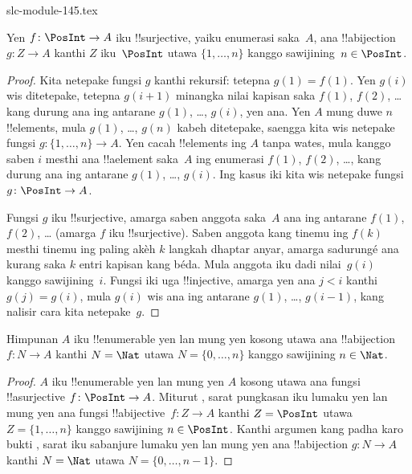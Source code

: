 \begin{filecontents*}[overwrite]{slc-module-145.tex}
\begin{prop}
Yen $f\colon \PosInt \to A$ iku !!{surjective}, yaiku enumerasi
saka~$A$, ana !!a{bijection} $g\colon Z \to A$ kanthi $Z$
iku~$\PosInt$ utawa $\{1, \dots, n\}$ kanggo sawijining~$n \in \PosInt$.
\end{prop}

\begin{proof}
  Kita netepake fungsi $g$ kanthi rekursif: tetepna $g(1) = f(1)$. Yen $g(i)$
  wis ditetepake, tetepna $g(i+1)$ minangka nilai kapisan saka $f(1)$,
  $f(2)$, \dots{} kang durung ana ing antarane $g(1)$, \dots, $g(i)$, yen ana.
  Yen $A$ mung duwe $n$ !!{element}s, mula $g(1)$, \dots, $g(n)$ kabeh
  ditetepake, saengga kita wis netepake fungsi $g\colon \{1, \dots, n\}
  \to A$. Yen cacah !!{element}s ing $A$ tanpa wates, mula kanggo saben $i$
  mesthi ana !!a{element} saka~$A$ ing enumerasi $f(1)$, $f(2)$,
  \dots, kang durung ana ing antarane $g(1)$, \dots, $g(i)$. Ing kasus
  iki kita wis netepake fungsi $g\colon \PosInt \to A$.

  Fungsi $g$ iku !!{surjective}, amarga saben anggota saka~$A$ ana
  ing antarane $f(1)$, $f(2)$, \dots{} (amarga $f$ iku !!{surjective}).
  Saben anggota kang tinemu ing $f(k)$ mesthi tinemu
ing paling akèh $k$ langkah dhaptar anyar, amarga sadurungé ana kurang saka
  $k$ entri kapisan kang béda. Mula anggota iku dadi nilai~$g(i)$
  kanggo sawijining~$i$. Fungsi iki uga
  !!{injective}, amarga yen ana $j < i$ kanthi $g(j) = g(i)$,
  mula $g(i)$ wis ana ing antarane $g(1)$, \dots, $g(i-1)$, kang
  nalisir cara kita netepake~$g$.
\end{proof}

\begin{cor}
Himpunan $A$ iku !!{enumerable} yen lan mung yen kosong utawa ana !!a{bijection}
$f\colon N \to A$ kanthi $N = \Nat$ utawa $N = \{0, \dots, n\}$ kanggo
sawijining $n \in \Nat$.
\end{cor}

\begin{proof}
$A$ iku !!{enumerable} yen lan mung yen $A$ kosong utawa ana fungsi !!a{surjective}
$f\colon \PosInt \to A$. Miturut , sarat pungkasan iku
lumaku yen lan mung yen ana fungsi !!a{bijective}~$f\colon Z \to A$ kanthi $Z =
\PosInt$ utawa $Z = \{1, \dots, n\}$ kanggo sawijining $n \in \PosInt$. Kanthi
argumen kang padha karo bukti , sarat iku sabanjure
lumaku yen lan mung yen ana !!a{bijection} $g\colon N \to A$ kanthi
$N = \Nat$ utawa $N = \{0, \dots, n-1\}$.
\end{proof}


\end{filecontents*}
